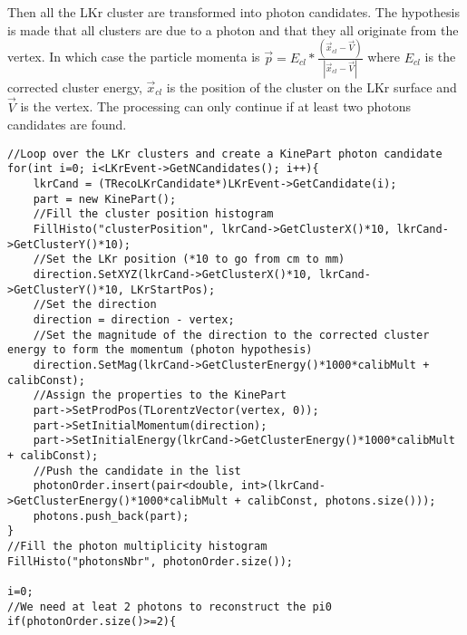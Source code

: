 Then all the LKr cluster are transformed into photon candidates. The hypothesis is made that all
clusters are due to a photon and that they all originate from the vertex. In which case the
particle momenta is 
$\vec{p}=E_{cl}*\frac{(\vec{x}_{cl}-\vec{V})}{\left|\vec{x}_{cl}-\vec{V}\right|}$ where $E_{cl}$ is
the corrected cluster energy, $\vec{x}_{cl}$ is the position of the cluster on the LKr surface and
$\vec{V}$ is the vertex. The processing can only continue if at least two photons candidates are
found.
\begin{lstlisting}
//Loop over the LKr clusters and create a KinePart photon candidate
for(int i=0; i<LKrEvent->GetNCandidates(); i++){
	lkrCand = (TRecoLKrCandidate*)LKrEvent->GetCandidate(i);
	part = new KinePart();
	//Fill the cluster position histogram
	FillHisto("clusterPosition", lkrCand->GetClusterX()*10, lkrCand->GetClusterY()*10);
	//Set the LKr position (*10 to go from cm to mm)
	direction.SetXYZ(lkrCand->GetClusterX()*10, lkrCand->GetClusterY()*10, LKrStartPos);
	//Set the direction
	direction = direction - vertex;
	//Set the magnitude of the direction to the corrected cluster energy to form the momentum (photon hypothesis)
	direction.SetMag(lkrCand->GetClusterEnergy()*1000*calibMult + calibConst);
	//Assign the properties to the KinePart
	part->SetProdPos(TLorentzVector(vertex, 0));
	part->SetInitialMomentum(direction);
	part->SetInitialEnergy(lkrCand->GetClusterEnergy()*1000*calibMult + calibConst);
	//Push the candidate in the list
	photonOrder.insert(pair<double, int>(lkrCand->GetClusterEnergy()*1000*calibMult + calibConst, photons.size()));
	photons.push_back(part);
}
//Fill the photon multiplicity histogram
FillHisto("photonsNbr", photonOrder.size());

i=0;
//We need at leat 2 photons to reconstruct the pi0
if(photonOrder.size()>=2){
\end{lstlisting}

